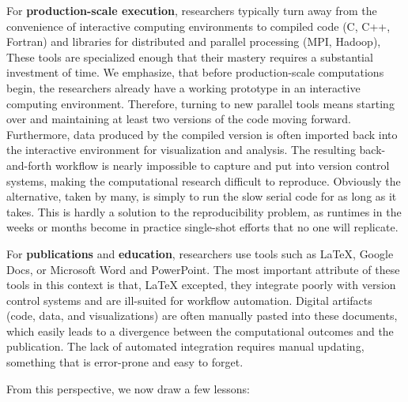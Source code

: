 \documentclass[11pt,oneside,english]{article}
\begin{document}
For \textbf{production-scale execution}, researchers typically turn away from
the convenience of interactive computing environments to compiled code (C, C++,
Fortran) and libraries for distributed and parallel processing (MPI, Hadoop),
These tools are specialized enough that their mastery requires a substantial
investment of time. We emphasize, that before production-scale computations
begin, the researchers already have a working prototype in an interactive
computing environment. Therefore, turning to new parallel tools means starting
over and maintaining at least two versions of the code moving forward.
Furthermore, data produced by the compiled version is often imported back into
the interactive environment for visualization and analysis. The resulting
back-and-forth workflow is nearly impossible to capture and put into version
control systems, making the computational research difficult to reproduce.
Obviously the alternative, taken by many, is simply to run the slow serial code
for as long as it takes.  This is hardly a solution to the reproducibility
problem, as runtimes in the weeks or months become in practice single-shot
efforts that no one will replicate.

For \textbf{publications} and \textbf{education}, researchers use tools such as
\LaTeX{}, Google Docs, or Microsoft Word and PowerPoint.  The most important
attribute of these tools in this context is that, \LaTeX{} excepted, they
integrate poorly with version control systems and are ill-suited for workflow
automation.  Digital artifacts (code, data, and visualizations) are often
manually pasted into these documents, which easily leads to a divergence
between the computational outcomes and the publication.  The lack of automated
integration requires manual updating, something that is error-prone and easy to
forget.

From this perspective, we now draw a few lessons:
\end{document}
